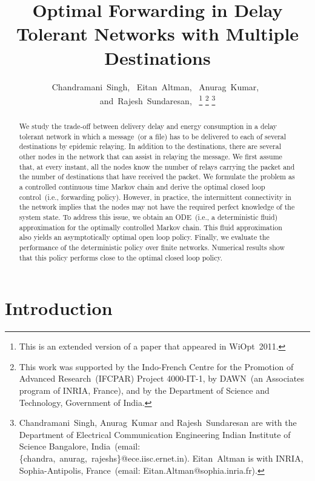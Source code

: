 \documentclass[10pt,journal,letterpaper]{IEEEtran}
\begin{document}
\title{Optimal Forwarding in Delay Tolerant Networks with Multiple Destinations}
\author{Chandramani~Singh,~
Eitan~Altman,~
Anurag~Kumar,~\\
and~Rajesh~Sundaresan,~
\thanks{This is an extended version of a paper that appeared in WiOpt~2011.}
\thanks{This work was supported by
the Indo-French Centre for the Promotion of Advanced
Research~(IFCPAR) Project 4000-IT-1, by DAWN~(an Associates
program of INRIA, France), and by the Department of Science 
and Technology, Government of India.}
\thanks{Chandramani~Singh, Anurag~Kumar and Rajesh~Sundaresan are with the Department of Electrical Communication Engineering
Indian Institute of Science Bangalore, India~(email: \{chandra,~anurag,~rajeshs\}@ece.iisc.ernet.in). Eitan~Altman is with INRIA, Sophia-Antipolis, France~(email: Eitan.Altman@sophia.inria.fr). }
}

\maketitle

\begin{abstract}

We study the trade-off between delivery delay and energy consumption
in a delay tolerant network in which a message~(or a file) has to be delivered to each of several
destinations by epidemic relaying. In addition to the destinations, there are
several other nodes in the network that can assist in relaying the message.
We first assume that, at every instant,
all the nodes know the number of relays carrying the
packet and the number of destinations that have received the packet. We formulate the problem
as a controlled continuous time Markov chain and derive the optimal closed loop control~(i.e., forwarding policy).
However, in practice, the intermittent connectivity in the network implies that the nodes may not have the required perfect knowledge
of the system state.
To address this issue, we obtain an ODE~(i.e., a deterministic fluid) approximation for the
optimally controlled Markov chain.
This fluid approximation also yields an asymptotically optimal open loop policy.
Finally, we evaluate the performance of the deterministic policy over finite networks.
Numerical results show that this policy performs close to the optimal closed loop policy.
\end{abstract}

\section{Introduction}
\end{document}
